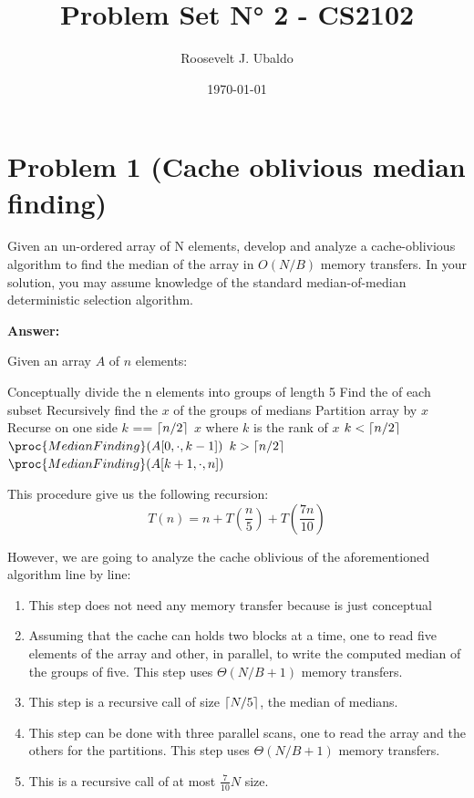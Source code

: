\documentclass{article}
\title{Problem Set N° 2 - CS2102}
\author{Roosevelt J. Ubaldo}
\date{\today}
\DeclarePairedDelimiter\ceil{\lceil}{\rceil}
\begin{document}
\maketitle

\section*{Problem 1 (Cache oblivious median finding)}
Given an un-ordered array of N elements, develop and analyze a cache-oblivious algorithm to find the median of the array in $O(N/B)$ memory transfers. In your solution, you may assume knowledge of the standard median-of-median deterministic selection algorithm.

\noindent \textbf{Answer: }

\noindent Given an array $A$ of $n$ elements: 
\begin{codebox}
\li Conceptually divide the n elements into groups of length 5 
\li Find the  of each subset
\li Recursively find the  $x$ of the groups of medians
\li Partition array by $x$
\li Recurse on one side
\li \Do \If $k$ ==  $\ceil{n/2}$ \Return $x$ \Comment where $k$ is the rank of $x$ \End
\li \Do \If $k < \ceil{n/2}$ \Return $\proc{MedianFinding}(A[0, \cdot, k-1])$ \End
\li \Do \If $k > \ceil{n/2}$ \Return $\proc{MedianFinding}(A[k+1, \cdot, n])$ \End
\end{codebox}

This procedure give us the following recursion: 
$$T(n) = n + T(\frac{n}{5}) + T(\frac{7n}{10})$$

However, we are going to analyze the cache oblivious of the aforementioned algorithm line by line:

\begin{enumerate}
    \item This step does not need any memory transfer because is just conceptual
    \item Assuming that the cache can holds two blocks at a time, one to read five elements of the array and other, in parallel, to write the computed median of the groups of five. This step uses $\Theta(N/B +1)$ memory transfers.
    \item This step is a recursive call of size $\ceil{N/5}$, the median of medians. 
    \item This step can be done with three parallel scans, one to read the array and the others for the partitions. This step uses $\Theta (N/B+1)$ memory transfers.
    \item This is a recursive call of at most $\frac{7}{10}N$ size.
\end{enumerate}
\end{document}
